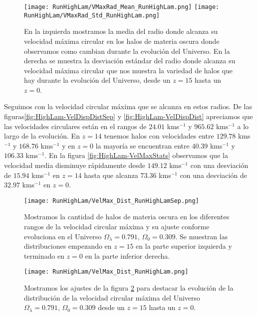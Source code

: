\begin{figure}[H]
    \centering
    \texttt{[image: RunHighLam/VMaxRad\_Mean\_RunHighLam.png]}
    \texttt{[image: RunHighLam/VMaxRad\_Std\_RunHighLam.png]}
    \caption[Media y desviación estándar del Radio donde se alcanza la velocidad máxima circular]{\footnotesize En la izquierda mostramos la media del radio donde alcanza su velocidad máxima circular en los halos de materia oscura donde observamos como cambian durante la evolución del Universo. En la derecha se muestra la desviación estándar del radio donde alcanza su velocidad máxima circular que nos muestra la variedad de halos que hay durante la evolución del Universo, desde un $z=15$ hasta un $z=0$.}
    \label{fig:HighLam-VMaxRadStats}
\end{figure}

Seguimos con la velocidad circular máxima que se alcanza en estos radios. De las figuras\ref{fig:HighLam-VelDispDistSep} y \ref{fig:HighLam-VelDispDist} apreciamos que las velocidades circulares están en el rangos de $24.01$ kms$^{-1}$ y $965.62$ kms$^{-1}$ a lo largo de la evolución. En $z=14$ tenemos halos con velocidades entre $129.78$ kms$^{-1}$ y $168.76$ kms$^{-1}$ y en $z=0$ la mayoría se encuentran entre $40.39$ kms$^{-1}$ y $106.33$ kms$^{-1}$. En la figura \ref{fig:HighLam-VelMaxStats} observamos que la velocidad media disminuye rápidamente desde $149.12$ kms$^{-1}$ con una desviación de $15.94$ kms$^{-1}$ en $z=14$ hasta que alcanza $73.36$ kms$^{-1}$ con una desviación de $32.97$ kms$^{-1}$ en $z=0$.

\begin{figure}[H]
    \centering
    \texttt{[image: RunHighLam/VelMax\_Dist\_RunHighLamSep.png]}
    \caption[Velocidad circular máxima]{\footnotesize Mostramos la cantidad de halos de materia oscura en los diferentes rangos de la velocidad circular máxima y su ajuste conforme evoluciona en el Universo $\Omega_\lambda = 0.791$, $\Omega_0 = 0.309$. Se muestran las distribuciones empezando en $z=15$ en la parte superior izquierda y terminado en $z=0$ en la parte inferior derecha.}
    \label{fig:HighLam-VelMaxDistSep}
\end{figure}

\begin{figure}[H]
    \centering
    \texttt{[image: RunHighLam/VelMax\_Dist\_RunHighLam.png]}
    \caption[Distribución de la velocidad circular máxima]{\footnotesize Mostramos los ajustes de la figura \ref{fig:HighLam-VelMaxDistSep} para destacar la evolución de la distribución de la velocidad circular máxima del Universo $\Omega_\lambda = 0.791$, $\Omega_0 = 0.309$ desde un $z=15$ hasta un $z=0$.}
    \label{fig:HighLam-VelMaxDist}
\end{figure}

